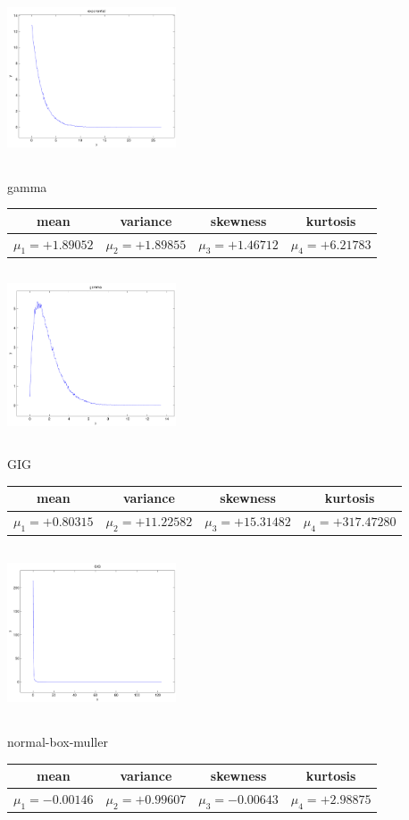 \documentclass[9pt]{article}
\theoremstyle{plain}
\theoremstyle{definition}
\theoremstyle{remark}
\numberwithin{equation}{section}
\begin{document}
\includegraphics[width=5cm,height=5cm]{exponential.pdf}

\newpage
gamma \begin{tabular}{|c|c|c|c|}  mean & variance & skewness & kurtosis \\  \hline
$\mu_1 = +1.89052$ & $\mu_2 = +1.89855$ & $\mu_3 = +1.46712$ & $\mu_4 =+6.21783$ \\
\end{tabular}

\includegraphics[width=5cm,height=5cm]{gamma.pdf}

GIG \begin{tabular}{|c|c|c|c|}  mean & variance & skewness & kurtosis \\  \hline
$\mu_1 = +0.80315$ & $\mu_2 = +11.22582$ & $\mu_3 = +15.31482$ & $\mu_4 =+317.47280$ \\
\end{tabular}

\includegraphics[width=5cm,height=5cm]{GIG.pdf}

normal-box-muller \begin{tabular}{|c|c|c|c|}  mean & variance & skewness & kurtosis \\  \hline
$\mu_1 = -0.00146$ & $\mu_2 = +0.99607$ & $\mu_3 = -0.00643$ & $\mu_4 =+2.98875$ \\
\end{tabular}
\end{document}
